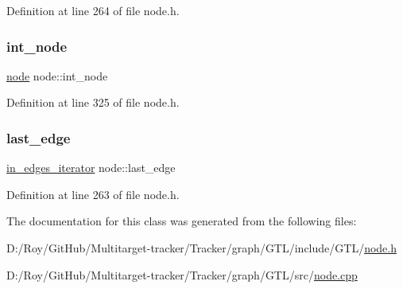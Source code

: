 Definition at line 264 of file node.\+h.

\mbox{\label{classnode_aea3ac7e8efe26d960bc6c76f741ebce5}} 
\subsubsection{\texorpdfstring{int\+\_\+node}{int\_node}}
{\footnotesize\ttfamily \mbox{\hyperlink{classnode}{node}} node\+::int\+\_\+node\hspace{0.3cm}{\ttfamily [private]}}



Definition at line 325 of file node.\+h.

\mbox{\label{classnode_a35449752b36330ed35552193166e96b0}} 
\subsubsection{\texorpdfstring{last\+\_\+edge}{last\_edge}}
{\footnotesize\ttfamily \mbox{\hyperlink{classnode_a9a96be92add7c1a2771bcd0431ebf8ab}{in\+\_\+edges\+\_\+iterator}} node\+::last\+\_\+edge\hspace{0.3cm}{\ttfamily [private]}}



Definition at line 263 of file node.\+h.



The documentation for this class was generated from the following files\+:\begin{DoxyCompactItemize}
\item 
D\+:/\+Roy/\+Git\+Hub/\+Multitarget-\/tracker/\+Tracker/graph/\+G\+T\+L/include/\+G\+T\+L/\mbox{\hyperlink{node_8h}{node.\+h}}\item 
D\+:/\+Roy/\+Git\+Hub/\+Multitarget-\/tracker/\+Tracker/graph/\+G\+T\+L/src/\mbox{\hyperlink{node_8cpp}{node.\+cpp}}\end{DoxyCompactItemize}
